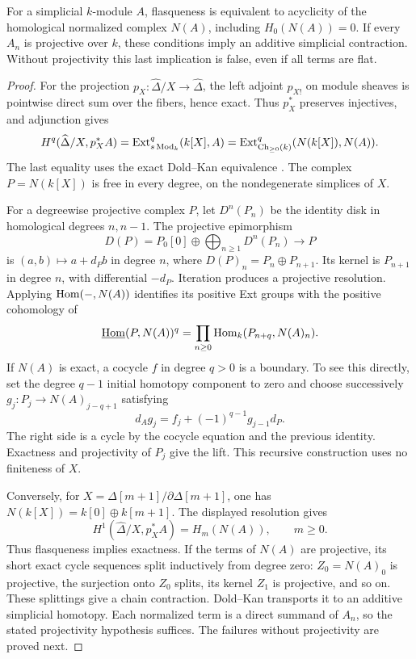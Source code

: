 \begin{theorem}\label{sa08:C02}
For a simplicial $k$-module $A$, flasqueness is equivalent to
acyclicity of the homological normalized complex $N(A)$, including
$H_0(N(A))=0$. If every $A_n$ is projective over $k$, these conditions
imply an additive simplicial contraction. Without projectivity this
last implication is false, even if all terms are flat.
\end{theorem}
\begin{proof}
For the projection $p_X:\widehat\Delta/X\to\widehat\Delta$, the
left adjoint $p_{X!}$ on module sheaves is pointwise direct sum over
the fibers, hence exact. Thus $p_X^*$ preserves injectives, and
adjunction gives
\[
 H^q(\widehat\Delta/X,p_X^*A)
 =\operatorname{Ext}^q_{s\operatorname{Mod}_k}(k[X],A)
 =\operatorname{Ext}^q_{\operatorname{Ch}_{\ge0}(k)}(N(k[X]),N(A)).
\]
The last equality uses the exact Dold--Kan equivalence
\cite[Theorem~14.24.3]{stacks-doldkan}. The complex $P=N(k[X])$ is free
in every degree, on the nondegenerate simplices of $X$.

For a degreewise projective complex $P$, let $D^n(P_n)$ be the identity
disk in homological degrees $n,n-1$. The projective epimorphism
\[
 D(P)=P_0[0]\oplus\bigoplus_{n\ge1}D^n(P_n)\longrightarrow P
\]
is $(a,b)\mapsto a+d_Pb$ in degree $n$, where
$D(P)_n=P_n\oplus P_{n+1}$. Its kernel is $P_{n+1}$ in degree $n$,
with differential $-d_P$. Iteration produces a projective resolution.
Applying $\operatorname{Hom}(-,N(A))$ identifies its positive Ext groups with the
positive cohomology of
\[
 \underline{\operatorname{Hom}}(P,N(A))^q
 =\prod_{n\ge0}\operatorname{Hom}_k(P_{n+q},N(A)_n).
\]
If $N(A)$ is exact, a cocycle $f$ in degree $q>0$ is a boundary.
To see this directly, set the degree $q-1$ initial homotopy component
to zero and choose successively $g_j:P_j\to N(A)_{j-q+1}$ satisfying
\[
 d_Ag_j=f_j+(-1)^{q-1}g_{j-1}d_P.
\]
The right side is a cycle by the cocycle equation and the previous
identity. Exactness and projectivity of $P_j$ give the lift. This
recursive construction uses no finiteness of $X$.

Conversely, for $X=\Delta[m+1]/\partial\Delta[m+1]$, one has
$N(k[X])=k[0]\oplus k[m+1]$. The displayed resolution gives
\[
 H^1(\widehat\Delta/X,p_X^*A)=H_m(N(A)),\qquad m\ge0.
\]
Thus flasqueness implies exactness. If the terms of $N(A)$ are
projective, its short exact cycle sequences split inductively from
degree zero: $Z_0=N(A)_0$ is projective, the surjection onto $Z_0$
splits, its kernel $Z_1$ is projective, and so on. These splittings
give a chain contraction. Dold--Kan transports it to an additive
simplicial homotopy. Each normalized term is a direct summand of
$A_n$, so the stated projectivity hypothesis suffices. The failures
without projectivity are proved next.
\end{proof}

